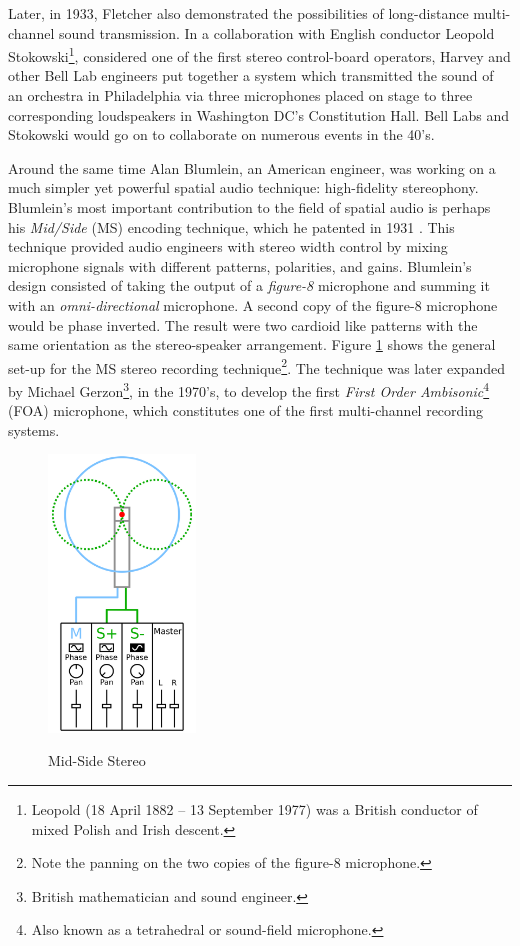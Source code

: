 Later, in 1933, Fletcher also demonstrated the possibilities of long-distance multi-channel sound transmission. In a collaboration with English conductor Leopold Stokowski\footnote{Leopold (18 April 1882 – 13 September 1977) was a British conductor of mixed Polish and Irish descent.}, considered one of the first stereo control-board operators\cite{mcginn1983stokowski}, Harvey and other Bell Lab engineers put together a system which transmitted the sound of an orchestra in Philadelphia via three microphones placed on stage to three corresponding loudspeakers in Washington DC's Constitution Hall. Bell Labs and Stokowski would go on to collaborate on numerous events in the 40's. 

Around the same time Alan Blumlein, an American engineer, was working on a much simpler yet powerful spatial audio technique: high-fidelity stereophony. Blumlein's most important contribution to the field of spatial audio is perhaps his \textit{Mid/Side} (MS) encoding technique, which he patented in 1931 \cite{billingsley1987simulated}. This technique provided audio engineers with stereo width control by mixing microphone signals with different patterns, polarities, and gains. Blumlein's design consisted of taking the output of a \textit{figure-8} microphone and summing it with an \textit{omni-directional} microphone. A second copy of the figure-8 microphone would be phase inverted. The result were two cardioid like patterns with the same orientation as the stereo-speaker arrangement. Figure \ref{fig:ms_stereo} shows the general set-up for the MS stereo recording technique\footnote{Note the panning on the two copies of the figure-8 microphone.}. The technique was later expanded by Michael Gerzon\footnote{British mathematician and sound engineer.}, in the 1970's, to develop the first \textit{First Order Ambisonic}\footnote{Also known as a tetrahedral or sound-field microphone.} (FOA) microphone, which constitutes one of the first multi-channel recording systems.  

\begin{figure}[h!]%
\centering
\includegraphics[width=0.35\textwidth]{img/ms_stereo.svg.png} 
\label{fig:ms_stereo}
\caption{Mid-Side Stereo \cite{ms_stereo_pic}}
\end{figure}

